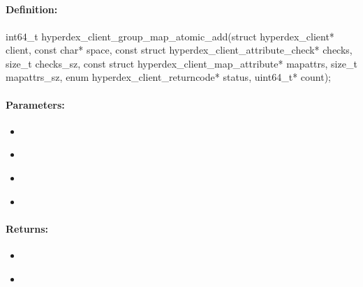 \pagebreak
\subsection{}
\label{api:c:group_map_atomic_add}


\paragraph{Definition:}
\begin{ccode}
int64_t hyperdex_client_group_map_atomic_add(struct hyperdex_client* client,
        const char* space,
        const struct hyperdex_client_attribute_check* checks, size_t checks_sz,
        const struct hyperdex_client_map_attribute* mapattrs, size_t mapattrs_sz,
        enum hyperdex_client_returncode* status,
        uint64_t* count);
\end{ccode}

\paragraph{Parameters:}
\begin{itemize}[noitemsep]
\item {}\\

\item {}\\

\item {}\\

\item {}\\

\end{itemize}

\paragraph{Returns:}
\begin{itemize}[noitemsep]
\item {}\\

\item {}\\

\end{itemize}

